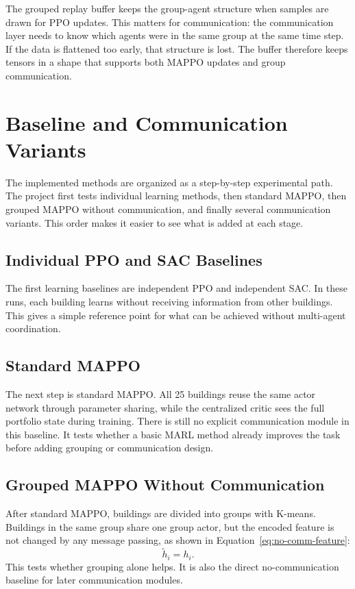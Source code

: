 The grouped replay buffer keeps the group-agent structure when samples are drawn
for PPO updates. This matters for communication: the communication layer needs
to know which agents were in the same group at the same time step. If the data is
flattened too early, that structure is lost. The buffer therefore keeps tensors
in a shape that supports both MAPPO updates and group communication.

\section{Baseline and Communication Variants}

The implemented methods are organized as a step-by-step experimental path. The
project first tests individual learning methods, then standard MAPPO, then
grouped MAPPO without communication, and finally several communication variants.
This order makes it easier to see what is added at each stage.

\subsection{Individual PPO and SAC Baselines}

The first learning baselines are independent PPO and independent SAC. In these
runs, each building learns without receiving information from other buildings.
This gives a simple reference point for what can be achieved without multi-agent
coordination.

\subsection{Standard MAPPO}

The next step is standard MAPPO. All 25 buildings reuse the same actor network
through parameter sharing, while the centralized critic sees the full portfolio
state during training. There is still no explicit communication module in this
baseline. It tests whether a basic MARL method already improves the task before
adding grouping or communication design.

\subsection{Grouped MAPPO Without Communication}

After standard MAPPO, buildings are divided into groups with K-means. Buildings
in the same group share one group actor, but the encoded feature is not changed
by any message passing, as shown in Equation~\eqref{eq:no-comm-feature}:
\begin{equation}
\label{eq:no-comm-feature}
\tilde{h}_i = h_i .
\end{equation}
This tests whether grouping alone helps. It is also the direct no-communication
baseline for later communication modules.

